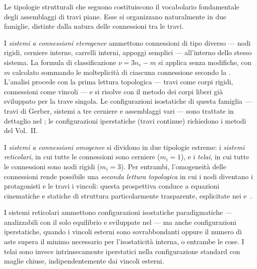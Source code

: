 Le tipologie strutturali che seguono costituiscono il
vocabolario fondamentale degli assemblaggi di travi piane.
Esse si organizzano naturalmente in due famiglie,
distinte dalla natura delle connessioni tra le travi.

I \emph{sistemi a connessioni eterogenee} ammettono
connessioni di tipo diverso --- nodi rigidi, cerniere
interne, carrelli interni, appoggi semplici --- all'interno
dello stesso sistema. La formula di classificazione
$\nu = 3n_e - m$ si applica senza modifiche, con $m$
calcolato sommando le molteplicità di ciascuna connessione
secondo la . L'analisi procede con
la prima lettura topologica --- travi come corpi rigidi,
connessioni come vincoli --- e si risolve con il metodo
dei corpi liberi già sviluppato per la trave singola.
Le configurazioni isostatiche di questa famiglia ---
travi di Gerber, sistemi a tre cerniere e assemblaggi
vari --- sono trattate in dettaglio nel
; le configurazioni iperstatiche
(travi continue) richiedono i metodi del Vol.~II.

I \emph{sistemi a connessioni omogenee} si dividono
in due tipologie estreme: i \emph{sistemi reticolari},
in cui tutte le connessioni sono cerniere ($m_i = 1$),
e i \emph{telai}, in cui tutte le connessioni sono
nodi rigidi ($m_i = 3$). Per entrambi, l'omogeneità
delle connessioni rende possibile una \emph{seconda
	lettura topologica} in cui i nodi diventano i
protagonisti e le travi i vincoli: questa prospettiva
conduce a equazioni cinematiche e statiche di struttura
particolarmente trasparente, esplicitate nei
 e~.

I sistemi reticolari ammettono configurazioni
isostatiche paradigmatiche --- analizzabili con il
solo equilibrio e sviluppate nel 
--- ma anche configurazioni iperstatiche, quando i
vincoli esterni sono sovrabbondanti oppure il numero
di aste supera il minimo necessario per l'isostaticità
interna, o entrambe le cose. I telai sono invece
intrinsecamente iperstatici nella configurazione
standard con maglie chiuse, indipendentemente dai
vincoli esterni.

